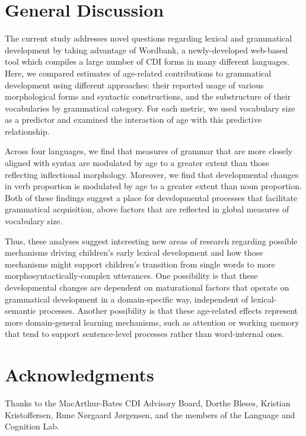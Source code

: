 \documentclass[10pt,letterpaper]{article}
\begin{document}
\section{General Discussion}

The current study addresses novel questions regarding lexical and grammatical development by taking advantage of Wordbank, a newly-developed web-based tool which compiles a large number of CDI forms in many different languages.  Here, we compared estimates of age-related contributions to grammatical development using different approaches: their reported usage of various morphological forms and syntactic constructions, and the substructure of their vocabularies by grammatical category. For each metric, we used vocabulary size as a predictor and examined the interaction of age with this predictive relationship.

Across four languages, we find that measures of grammar that are more closely aligned with syntax are modulated by age to a greater extent than those reflecting inflectional morphology.  Moreover, we find that  developmental changes in verb proportion is modulated by age to a greater extent than noun proportion. Both of these findings suggest a place for developmental processes that facilitate grammatical acquisition, above factors that are reflected in global measures of vocabulary size.

Thus, these analyses suggest interesting new areas of research regarding possible mechanisms driving children's early lexical development and how those mechanisms might support children's transition from single words to more morphosyntactically-complex utterances.  One possibility is that these developmental changes are dependent on maturational factors that operate on grammatical development in a domain-specific way, independent of lexical-semantic processes.  Another possibility is that these age-related effects represent more domain-general learning mechanisms, such as attention or working memory that tend to support sentence-level processes rather than word-internal ones.

\section{Acknowledgments}

Thanks to the MacArthur-Bates CDI Advisory Board, Dorthe Bleses, Kristian Kristoffersen, Rune N\o rgaard J\o rgensen, and the members of the Language and Cognition Lab. 



\setlength{\bibleftmargin}{.125in}
\setlength{\bibindent}{-\bibleftmargin}


\end{document}
